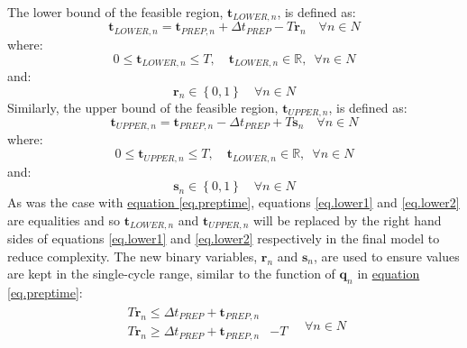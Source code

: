 The lower bound of the feasible region, $\boldsymbol{t}_{\mathit{LOWER},n}$, is
defined as:
\begin{equation}
    \boldsymbol{t}_{\mathit{LOWER},n} = \boldsymbol{t}_{\mathit{PREP},n} +
    \Delta t_{\mathit{PREP}} - T \boldsymbol{r}_{n} \quad \forall n \in N
    \label{eq.lower1}
\end{equation}
where:
\begin{equation}
    0 \le \boldsymbol{t}_{\mathit{LOWER},n} \le T, \quad 
    \boldsymbol{t}_{\mathit{LOWER},n} \in \mathbb{R}, \enspace \forall n \in N
    \label{eq.lower2}
\end{equation}
and:
\begin{equation}
    \boldsymbol{r}_{n} \in \left\{ 0, 1 \right\} \quad \forall n \in N
    \label{eq.s}
\end{equation}
Similarly, the upper bound of the feasible region, 
$\boldsymbol{t}_{\mathit{UPPER},n}$, is defined as:
\begin{equation}
    \boldsymbol{t}_{\mathit{UPPER},n} = \boldsymbol{t}_{\mathit{PREP},n} -
    \Delta t_{\mathit{PREP}} + T \boldsymbol{s}_{n} \quad \forall n \in N
    \label{eq.upper1}
\end{equation}
where:
\begin{equation}
    0 \le \boldsymbol{t}_{\mathit{UPPER},n} \le T, \quad
    \boldsymbol{t}_{\mathit{LOWER},n} \in \mathbb{R}, \enspace \forall n \in N
    \label{eq.upper2}
\end{equation}
and:
\begin{equation}
    \boldsymbol{s}_{n} \in \left\{ 0, 1 \right\} \quad \forall n \in N
    \label{eq.s}
\end{equation} 
As was the case with \hyperref[eq.preptime]{equation \ref*{eq.preptime}},
equations \ref{eq.lower1} and \ref{eq.lower2} are equalities and so 
$\boldsymbol{t}_{\mathit{LOWER},n}$ and $\boldsymbol{t}_{\mathit{UPPER},n}$
will be replaced by the right hand sides of equations \ref{eq.lower1} and
\ref{eq.lower2} respectively in the final model to reduce complexity.
The new binary variables, $\boldsymbol{r}_{n}$ and $\boldsymbol{s}_{n}$, are
used to ensure values are kept in the single-cycle range, similar to the
function of $\boldsymbol{q}_{n}$ in
\hyperref[eq.preptime]{equation \ref*{eq.preptime}}:
\begin{equation}
    \begin{split}
        \begin{alignedat}{2}
            T \boldsymbol{r}_{n} \le \Delta t_{\mathit{PREP}}
            + \boldsymbol{t}_{\mathit{PREP},n}&\\
            T \boldsymbol{r}_{n} \ge \Delta t_{\mathit{PREP}}
            + \boldsymbol{t}_{\mathit{PREP},n}& - T\\
            \end{alignedat}
        \quad \forall n \in N
    \end{split}
    \label{eq.r}
\end{equation}
